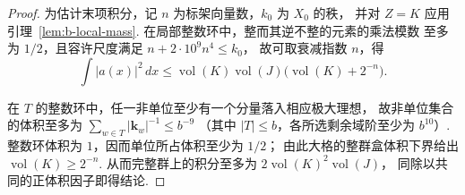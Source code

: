 \begin{proof}
为估计末项积分，记 $n$ 为标架向量数，$k_0$ 为 $X_0$ 的秩，
并对 $Z=K$ 应用引理~\ref{lem:b-local-mass}. 在局部整数环中，整而其逆不整的元素的乘法模数
至多为 $1/2$，且容许尺度满足 $n+2\cdot10^9 n^4\le k_0$，
故可取衰减指数 $n$，得
\[
 \int |a(x)|^2\,dx\le
 \operatorname{vol}(K)\operatorname{vol}(J)
             \bigl(\operatorname{vol}(K)+2^{-n}\bigr).
\]

在 $T$ 的整数环中，任一非单位至少有一个分量落入相应极大理想，
故非单位集合的体积至多为 $\sum_{w\in T}|\mathbf k_w|^{-1}\le b^{-9}$
（其中 $|T|\le b$，各所选剩余域阶至少为 $b^{10}$）.
整数环体积为 $1$，因而单位所占体积至少为 $1/2$；
由此大格的整群盒体积下界给出 $\operatorname{vol}(K)\ge2^{-n}$.
从而完整群上的积分至多为
$2\operatorname{vol}(K)^2\operatorname{vol}(J)$，
同除以共同的正体积因子即得结论.
\end{proof}

